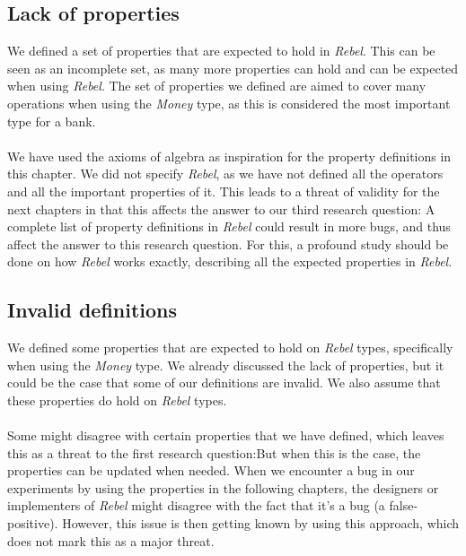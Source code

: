 \subsection*{Lack of properties}
We defined a set of properties that are expected to hold in \textit{Rebel}.
This can be seen as an incomplete set, as many more properties can hold and can
be expected when using \textit{Rebel}. The set of properties we defined are
aimed to cover many operations when using the \textit{Money} type, as this is
considered the most important type for a bank.\\
\\
We have used the axioms of algebra as inspiration for the property definitions
in this chapter. We did not specify \textit{Rebel}, as we have not defined all
the operators and all the important properties of it. This leads to a threat of
validity for the next chapters in that this affects the answer to our third
research question:\rqThree
A complete list of property definitions in
\textit{Rebel} could result in more bugs, and thus affect the answer to this
research question. For this, a profound study should be done on how
\textit{Rebel} works exactly, describing all the expected properties in
\textit{Rebel}.

\subsection*{Invalid definitions}
We defined some properties that are expected to hold on \textit{Rebel} types,
specifically when using the \textit{Money} type. We already discussed the lack
of properties, but it could be the case that some of our definitions are
invalid. We also assume that these properties do hold on \textit{Rebel}
types.\\
\\
Some might disagree with certain properties that we have defined, which leaves
this as a threat to the first research question:\rqOne But when this is the
case, the properties can be updated when needed. When we encounter a bug in our
experiments by using the properties in the following chapters, the designers or
implementers of \textit{Rebel} might disagree with the fact that it's a bug
(a false-positive). However, this issue is then getting known by using this
approach, which does not mark this as a major threat.

